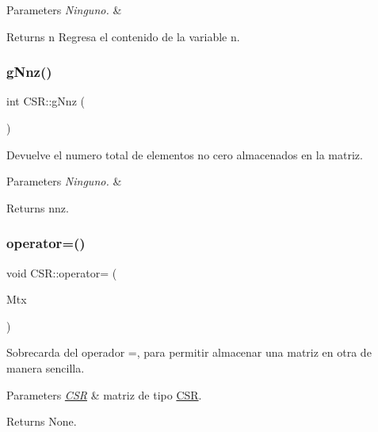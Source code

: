 \begin{DoxyParams}{Parameters}
{\em Ninguno.} & \\
\hline
\end{DoxyParams}
\begin{DoxyReturn}{Returns}
n Regresa el contenido de la variable n. 
\end{DoxyReturn}
\hypertarget{class_c_s_r_a0c25f2e1649edb38387ca56e39874cc9}{}\label{class_c_s_r_a0c25f2e1649edb38387ca56e39874cc9} 
\subsubsection{\texorpdfstring{g\+Nnz()}{gNnz()}}
{\footnotesize\ttfamily int C\+S\+R\+::g\+Nnz (\begin{DoxyParamCaption}{ }\end{DoxyParamCaption})\hspace{0.3cm}{\ttfamily [inline]}}



Devuelve el numero total de elementos no cero almacenados en la matriz. 


\begin{DoxyParams}{Parameters}
{\em Ninguno.} & \\
\hline
\end{DoxyParams}
\begin{DoxyReturn}{Returns}
nnz. 
\end{DoxyReturn}
\hypertarget{class_c_s_r_a8fafaf968b8989033f26038f1ea3b444}{}\label{class_c_s_r_a8fafaf968b8989033f26038f1ea3b444} 
\subsubsection{\texorpdfstring{operator=()}{operator=()}}
{\footnotesize\ttfamily void C\+S\+R\+::operator= (\begin{DoxyParamCaption}\item[{\hyperlink{class_c_s_r}{C\+SR} const \&}]{Mtx }\end{DoxyParamCaption})}



Sobrecarda del operador =, para permitir almacenar una matriz en otra de manera sencilla. 


\begin{DoxyParams}{Parameters}
{\em \hyperlink{class_c_s_r}{C\+SR}} & matriz de tipo \hyperlink{class_c_s_r}{C\+SR}. \\
\hline
\end{DoxyParams}
\begin{DoxyReturn}{Returns}
None. 
\end{DoxyReturn}
\hypertarget{class_c_s_r_a5c5d4c602abb10f64bbabbdede9fdb11}{}\label{class_c_s_r_a5c5d4c602abb10f64bbabbdede9fdb11} 
